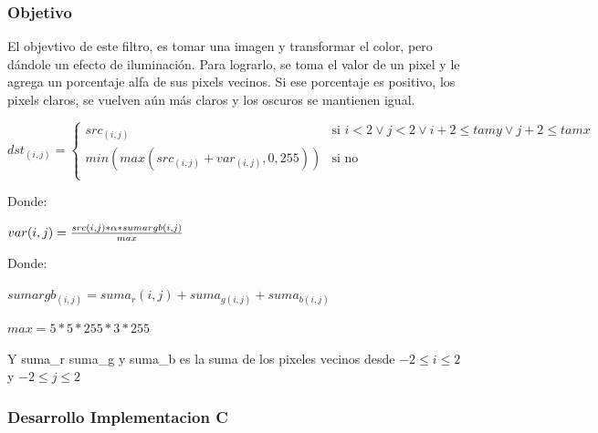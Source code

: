 \vspace*{0.3cm} \noindent
\subsubsection{Objetivo}

El objevtivo de este filtro, es tomar una imagen y transformar el color, pero dándole un efecto de iluminación. \newline
Para lograrlo, se toma el valor de un pixel y le agrega un porcentaje alfa de sus pixels vecinos. \newline
Si ese porcentaje es positivo, los pixels claros, se vuelven aún más claros y los oscuros se mantienen igual.\newline

       
\[ dst_{(i,j)} = \left\{ \begin{array}{ll}
         src_{(i,j)} & \mbox{si $i < 2 \vee j < 2 \vee i + 2 \leq tamy \vee j + 2 \leq tamx  $}\\
        min(max(src_{(i,j)} + var_{(i,j)},0, 255)) & \mbox{si no}\\\end{array} \right. \]     
        
Donde:\newline

{\large$var (i,j) = \frac{{\large src(i, j) * \alpha * sumargb (i,j)}}{{\large max}}$} \newline

Donde:\newline

$sumargb_{(i,j)} = suma_r{(i,j)} + suma_{g(i,j)} + suma_{b(i,j)}$ \newline

$max = 5 * 5 * 255 * 3 * 255$\newline

Y suma\_r suma\_g y suma\_b es la suma de los pixeles vecinos desde $-2 \leq i \leq 2$ y $-2 \leq j \leq 2$

\vspace*{0.3cm} \noindent

\subsubsection{Desarrollo Implementacion C}

